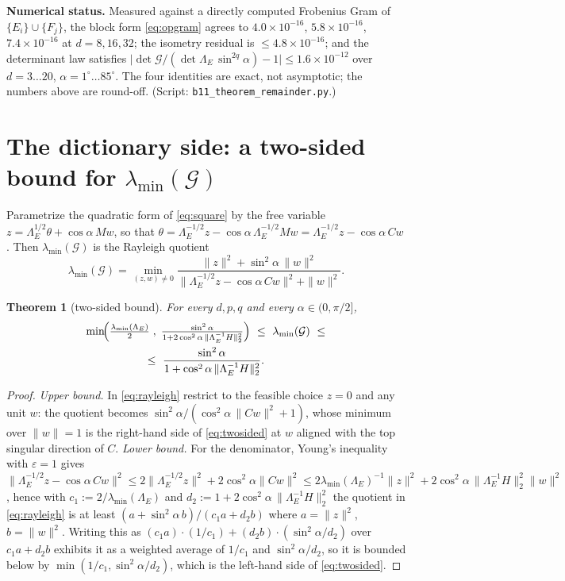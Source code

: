 \documentclass[11pt]{article}
\newtheorem{theorem}{Theorem}[section]
\theoremstyle{remark}
\newcommand{\Gr}{\mathcal{G}}
\newcommand{\Le}{\Lambda_E}
\newcommand{\Cnorm}{\bigl\|\Le^{-1}H\bigr\|_2^2}
\begin{document}
\noindent\textbf{Numerical status.} Measured against a directly computed Frobenius Gram
of $\{E_i\}\cup\{F_j\}$, the block form \eqref{eq:opgram} agrees to
$4.0\!\times\!10^{-16}$, $5.8\!\times\!10^{-16}$, $7.4\!\times\!10^{-16}$ at $d=8,16,32$;
the isometry residual is $\le4.8\!\times\!10^{-16}$; and the determinant law satisfies
$\bigl|\det\Gr/(\det\Le\,\sin^{2q}\alpha)-1\bigr|\le1.6\!\times\!10^{-12}$ over
$d=3\ldots20$, $\alpha=1^\circ\ldots85^\circ$. The four identities are exact, not
asymptotic; the numbers above are round-off. (Script: \texttt{b11\_theorem\_remainder.py}.)

\section{The dictionary side: a two-sided bound for $\lambda_{\min}(\Gr)$}
\label{sec:twosided}

Parametrize the quadratic form of \eqref{eq:square} by the free variable
$z=\Le^{1/2}\theta+\cos\alpha\,Mw$, so that $\theta=\Le^{-1/2}z-\cos\alpha\,\Le^{-1/2}Mw
=\Le^{-1/2}z-\cos\alpha\,Cw$. Then $\lambda_{\min}(\Gr)$ is the Rayleigh quotient
\begin{equation}\label{eq:rayleigh}
  \lambda_{\min}(\Gr)=\min_{(z,w)\ne0}
  \frac{\|z\|^2+\sin^2\alpha\,\|w\|^2}
       {\|\Le^{-1/2}z-\cos\alpha\,Cw\|^2+\|w\|^2}.
\end{equation}

\begin{theorem}[two-sided bound]\label{thm:twosided}
For every $d,p,q$ and every $\alpha\in(0,\pi/2]$,
\begin{equation}\label{eq:twosided}
  \begin{gathered}
  \min\!\Bigl(\tfrac{\lambda_{\min}(\Le)}{2}\;,\;
             \tfrac{\sin^2\alpha}{1+2\cos^2\alpha\,\|\Le^{-1}H\|_2^2}\Bigr)
  \ \le\ \lambda_{\min}(\Gr)\ \le\\
  \le\ \frac{\sin^2\alpha}{1+\cos^2\alpha\,\|\Le^{-1}H\|_2^2}.
  \end{gathered}
\end{equation}
\end{theorem}

\begin{proof}
\emph{Upper bound.} In \eqref{eq:rayleigh} restrict to the feasible choice $z=0$ and any
unit $w$: the quotient becomes
$\sin^2\alpha/(\cos^2\alpha\,\|Cw\|^2+1)$, whose minimum over $\|w\|=1$ is the
right-hand side of \eqref{eq:twosided} at $w$ aligned with the top singular direction of
$C$. \emph{Lower bound.} For the denominator, Young's inequality with $\varepsilon=1$
gives $\|\Le^{-1/2}z-\cos\alpha\,Cw\|^2\le2\|\Le^{-1/2}z\|^2+2\cos^2\alpha\|Cw\|^2
\le2\lambda_{\min}(\Le)^{-1}\|z\|^2+2\cos^2\alpha\,\Cnorm\|w\|^2$, hence with
$c_1:=2/\lambda_{\min}(\Le)$ and $d_2:=1+2\cos^2\alpha\,\Cnorm$ the quotient in
\eqref{eq:rayleigh} is at least
$(a+\sin^2\alpha\,b)/(c_1a+d_2b)$ where $a=\|z\|^2$, $b=\|w\|^2$. Writing this as
$(c_1a)\cdot(1/c_1)+(d_2b)\cdot(\sin^2\alpha/d_2)$ over $c_1a+d_2b$ exhibits it as a
weighted average of $1/c_1$ and $\sin^2\alpha/d_2$, so it is bounded below by
$\min(1/c_1,\sin^2\alpha/d_2)$, which is the left-hand side of \eqref{eq:twosided}.
\end{proof}
\end{document}
